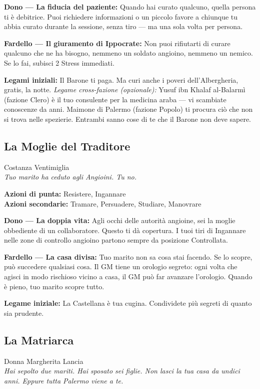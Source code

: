 \textbf{Dono — La fiducia del paziente:} Quando hai curato qualcuno,
quella persona ti è debitrice. Puoi richiedere informazioni o un
piccolo favore a chiunque tu abbia curato durante la sessione,
senza tiro — ma una sola volta per persona.

\textbf{Fardello — Il giuramento di Ippocrate:} Non puoi rifiutarti
di curare qualcuno che ne ha bisogno, nemmeno un soldato angioino,
nemmeno un nemico. Se lo fai, subisci 2 Stress immediati.

\textbf{Legami iniziali:} Il Barone ti paga. Ma curi anche i poveri
dell'Albergheria, gratis, la notte. \textit{Legame cross-fazione
(opzionale):} Yusuf ibn Khalaf al-Balarmì (fazione Clero) è il tuo
consulente per la medicina araba — vi scambiate conoscenze da anni.
Maimone di Palermo (fazione Popolo) ti procura ciò che non si trova
nelle spezierie. Entrambi sanno cose di te che il Barone non deve sapere.

\filetto

\subsection{La Moglie del Traditore}
{\cinzel\footnotesize\color{grigionote} Costanza Ventimiglia}\\
\textit{Tuo marito ha ceduto agli Angioini. Tu no.}

\textbf{Azioni di punta:} Resistere, Ingannare\\
\textbf{Azioni secondarie:} Tramare, Persuadere, Studiare, Manovrare

\textbf{Dono — La doppia vita:} Agli occhi delle autorità angioine,
sei la moglie obbediente di un collaboratore. Questo ti dà copertura.
I tuoi tiri di Ingannare nelle zone di controllo angioino
partono sempre da posizione Controllata.

\textbf{Fardello — La casa divisa:} Tuo marito non sa cosa stai
facendo. Se lo scopre, può succedere qualsiasi cosa. Il GM tiene
un orologio segreto: ogni volta che agisci in modo rischioso
vicino a casa, il GM può far avanzare l'orologio. Quando è pieno,
tuo marito scopre tutto.

\textbf{Legame iniziale:} La Castellana è tua cugina. Condividete
più segreti di quanto sia prudente.

\filetto

\subsection{La Matriarca}
{\cinzel\footnotesize\color{grigionote} Donna Margherita Lancia}\\
\textit{Hai sepolto due mariti. Hai sposato sei figlie. Non lasci
la tua casa da undici anni. Eppure tutta Palermo viene a te.}

